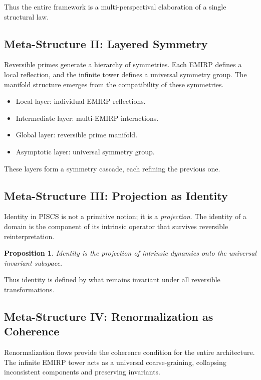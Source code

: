\documentclass[11pt]{article}
\theoremstyle{definition}
\theoremstyle{plain}
\newtheorem{proposition}[definition]{Proposition}
\theoremstyle{remark}
\begin{document}
Thus the entire framework is a multi-perspectival elaboration of a
single structural law.

\subsection{Meta-Structure II: Layered Symmetry}

Reversible primes generate a hierarchy of symmetries. Each EMIRP defines
a local reflection, and the infinite tower defines a universal symmetry
group. The manifold structure emerges from the compatibility of these
symmetries.

\begin{itemize}
    \item Local layer: individual EMIRP reflections.
    \item Intermediate layer: multi-EMIRP interactions.
    \item Global layer: reversible prime manifold.
    \item Asymptotic layer: universal symmetry group.
\end{itemize}

These layers form a symmetry cascade, each refining the previous one.

\subsection{Meta-Structure III: Projection as Identity}

Identity in PISCS is not a primitive notion; it is a \emph{projection}.
The identity of a domain is the component of its intrinsic operator that
survives reversible reinterpretation.

\begin{proposition}
Identity is the projection of intrinsic dynamics onto the universal
invariant subspace.
\end{proposition}

Thus identity is defined by what remains invariant under all reversible
transformations.

\subsection{Meta-Structure IV: Renormalization as Coherence}

Renormalization flows provide the coherence condition for the entire
architecture. The infinite EMIRP tower acts as a universal
coarse-graining, collapsing inconsistent components and preserving
invariants.
\end{document}
